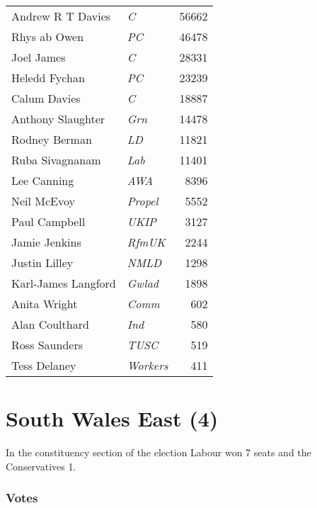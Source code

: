 {\footnotesize
\begin{tabular*}{\columnwidth}{@{\extracolsep{\fill}} p{} >{\itshape}l r @{\extracolsep{\fill}}}
	Andrew R T Davies & C & 56662\\%
	Rhys ab Owen & PC & 46478\\%
	Joel James & C & 28331\\%
	Heledd Fychan & PC & 23239\\%
	\hline
	Calum Davies & C & 18887\\
	Anthony Slaughter & Grn & 14478\\
	Rodney Berman & LD & 11821\\
	Ruba Sivagnanam & Lab & 11401\\
	Lee Canning & AWA & 8396\\
	Neil McEvoy & Propel & 5552\\
	Paul Campbell & UKIP & 3127\\
	Jamie Jenkins & RfmUK & 2244\\
	Justin Lilley & NMLD & 1298\\
	Karl-James Langford & Gwlad & 1898\\
	Anita Wright & Comm & 602\\
	Alan Coulthard & Ind & 580\\
	Ross Saunders & TUSC & 519\\
	Tess Delaney & Workers & 411\\
\end{tabular*}

}

\section[South Wales East]{South Wales East (4)}

In the constituency section of the election Labour won 7 seats and the Conservatives 1.

\subsubsection*{Votes}

